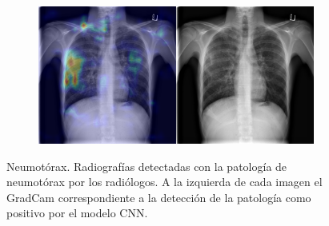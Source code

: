 \begin{figure}[b]
\begin{subfigure}{0.4\textwidth}
    \end{subfigure}
    \begin{subfigure}{0.4\textwidth}
        \centering
        \includegraphics[width=1.0\textwidth]{Chapters/5. Conclusiones/img/Pneumothorax/1_1_00001006_021.png}
    \end{subfigure}

    \caption[short]{Neumotórax. Radiografías detectadas con la patología de neumotórax por los
                    radiólogos. A la izquierda de cada imagen el GradCam correspondiente a la detección
                    de la patología como positivo por el modelo CNN.}
\end{figure}
